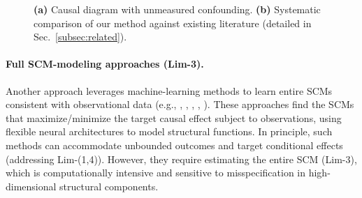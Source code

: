 \begin{figure}[t]
  \centering
  \begin{minipage}[c]{0.25\textwidth}
    \centering
  \end{minipage}
  \hfill 
  \begin{minipage}[c]{0.70\textwidth}
    \centering
    \subfloat[]{%
      \label{fig:positioning}%
    }%
  \end{minipage}

  \caption{\textbf{(a)} Causal diagram with unmeasured confounding.
  \textbf{(b)} Systematic comparison of our method against existing literature (detailed in Sec.~\ref{subsec:related}).}
  \label{fig:positioning_and_dgp}
\end{figure}


\paragraph{Full SCM-modeling approaches (Lim-3).} 
Another approach leverages machine-learning methods to learn entire SCMs consistent with observational data (e.g., \citet{hu2021generative}, \citet{balazadeh2022partial}, \citet{padh2023stochastic}, \citet{xia2022neural}, \citet{tan2024consistency}). These approaches find the SCMs that maximize/minimize the target causal effect subject to observations, using flexible neural architectures to model structural functions. In principle, such methods can accommodate unbounded outcomes and target conditional effects (addressing Lim-(1,4)). However, they require estimating the entire SCM (Lim-3), which is computationally intensive and sensitive to misspecification in high-dimensional structural components.


